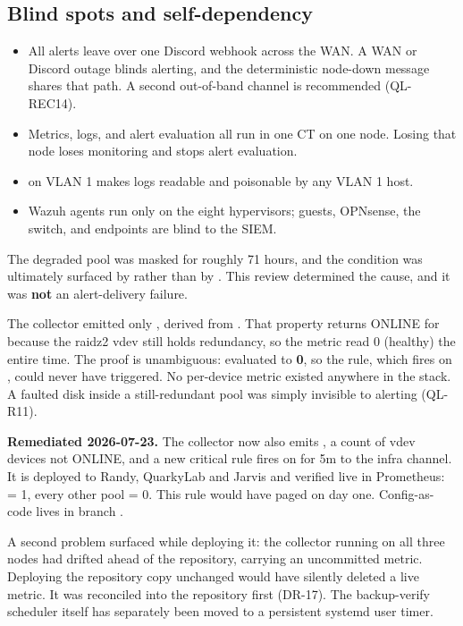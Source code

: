 \subsection{Blind spots and self-dependency}

\begin{itemize}
\item {} All alerts leave over one Discord webhook
across the WAN. A WAN or Discord outage blinds alerting, and the deterministic node-down message
shares that path. A second out-of-band channel is recommended (QL-REC14).
\item {} Metrics, logs, and alert evaluation all run in one CT on
one node. Losing that node loses monitoring and stops alert evaluation.
\item {}  on VLAN 1 makes logs readable and
poisonable by any VLAN 1 host.
\item {} Wazuh agents run only on the eight hypervisors; guests, OPNsense,
the switch, and endpoints are blind to the SIEM.
\end{itemize}

\begin{callout}[title={The silent-alert lesson, root-caused and closed}]
The degraded  pool was masked for roughly 71 hours, and the condition was ultimately
surfaced by  rather than by . This review
determined the cause, and it was \textbf{not} an alert-delivery failure.

The collector  emitted only , derived
from . That property returns ONLINE for  because the
raidz2 vdev still holds redundancy, so the metric read 0 (healthy) the entire time. The proof is
unambiguous:  evaluated to
\textbf{0}, so the rule, which fires on , could never have triggered. No per-device
metric existed anywhere in the stack. A faulted disk inside a still-redundant pool was simply
invisible to alerting (QL-R11).

\textbf{Remediated 2026-07-23.} The collector now also emits
, a count of vdev devices not ONLINE, and a
new critical rule  fires on  for 5m to the infra channel. It is
deployed to Randy, QuarkyLab and Jarvis and verified live in Prometheus:  = 1, every
other pool = 0. This rule would have paged on day one. Config-as-code lives in
 branch .

A second problem surfaced while deploying it: the collector running on all three nodes had
drifted ahead of the repository, carrying an uncommitted 
metric. Deploying the repository copy unchanged would have silently deleted a live metric. It was
reconciled into the repository first (DR-17). The backup-verify scheduler itself has separately
been moved to a persistent systemd user timer.
\end{callout}

